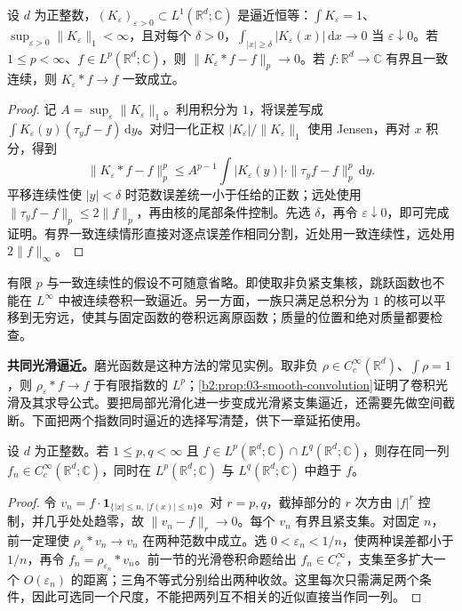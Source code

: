 \begin{theorem}\label{b2:thm:03-approximate-identity}
设 \(d\) 为正整数，\((K_\varepsilon)_{\varepsilon>0}\subset L^1(\mathbb R^d;\mathbb C)\) 是逼近恒等：\(\int K_\varepsilon=1\)、\(\sup_{\varepsilon>0}\|K_\varepsilon\|_1<\infty\)，且对每个 \(\delta>0\)，\(\int_{|x|\geq\delta}|K_\varepsilon(x)|\,\mathrm dx\to0\) 当 \(\varepsilon\downarrow0\)。若 \(1\leq p<\infty\)、\(f\in L^p(\mathbb R^d;\mathbb C)\)，则 \(\|K_\varepsilon*f-f\|_p\to0\)。若 \(f\colon\mathbb R^d\to\mathbb C\) 有界且一致连续，则 \(K_\varepsilon*f\to f\) 一致成立。
\end{theorem}
\begin{proof}
记 \(A=\sup_\varepsilon\|K_\varepsilon\|_1\)。利用积分为 \(1\)，将误差写成 \(\int K_\varepsilon(y)(\tau_yf-f)\,\mathrm{d}y\)。对归一化正权 \(|K_\varepsilon|/\|K_\varepsilon\|_1\) 使用 Jensen，再对 \(x\) 积分，得到
\[
 \|K_\varepsilon*f-f\|_p^p
 \leq A^{p-1}\int|K_\varepsilon(y)|\cdot\|\tau_yf-f\|_p^p\,\mathrm{d}y.
\]
平移连续性使 \(|y|<\delta\) 时范数误差统一小于任给的正数；远处使用 \(\|\tau_yf-f\|_p\leq2\|f\|_p\)，再由核的尾部条件控制。先选 \(\delta\)，再令 \(\varepsilon\downarrow0\)，即可完成证明。有界一致连续情形直接对逐点误差作相同分割，近处用一致连续性，远处用 \(2\|f\|_\infty\)。
\end{proof}

有限 \(p\) 与一致连续性的假设不可随意省略。即使取非负紧支集核，跳跃函数也不能在 \(L^\infty\) 中被连续卷积一致逼近。另一方面，一族只满足总积分为 \(1\) 的核可以平移到无穷远，使其与固定函数的卷积远离原函数；质量的位置和绝对质量都要检查。

\ProseParagraphBreak

\textbf{共同光滑逼近。}磨光函数是这种方法的常见实例。取非负 \(\rho\in C_c^\infty(\mathbb R^d)\)、\(\int\rho=1\)，则 \(\rho_\varepsilon*f\to f\) 于有限指数的 \(L^p\)；\cref{b2:prop:03-smooth-convolution}证明了卷积光滑及其求导公式。要把局部光滑化进一步变成光滑紧支集逼近，还需要先做空间截断。下面把两个指数同时逼近的选择写清楚，供下一章延拓使用。

\begin{proposition}\label{b2:prop:03-common-smooth-density}
设 \(d\) 为正整数。若 \(1\leq p,q<\infty\) 且 \(f\in L^p(\mathbb R^d;\mathbb C)\cap L^q(\mathbb R^d;\mathbb C)\)，则存在同一列 \(f_n\in C_c^\infty(\mathbb R^d;\mathbb C)\)，同时在 \(L^p(\mathbb R^d;\mathbb C)\) 与 \(L^q(\mathbb R^d;\mathbb C)\) 中趋于 \(f\)。
\end{proposition}
\begin{proof}
令 \(v_n=f\cdot\mathbf1_{\{|x|\leq n,\,|f(x)|\leq n\}}\)。对 \(r=p,q\)，截掉部分的 \(r\) 次方由 \(|f|^r\) 控制，并几乎处处趋零，故 \(\|v_n-f\|_r\to0\)。每个 \(v_n\) 有界且紧支集。对固定 \(n\)，前一定理使 \(\rho_\varepsilon*v_n\to v_n\) 在两种范数中成立。选 \(0<\varepsilon_n<1/n\)，使两种误差都小于 \(1/n\)，再令 \(f_n=\rho_{\varepsilon_n}*v_n\)。前一节的光滑卷积命题给出 \(f_n\in C_c^\infty\)，支集至多扩大一个 \(O(\varepsilon_n)\) 的距离；三角不等式分别给出两种收敛。这里每次只需满足两个条件，因此可选同一个尺度，不能把两列互不相关的近似直接当作同一列。
\end{proof}


